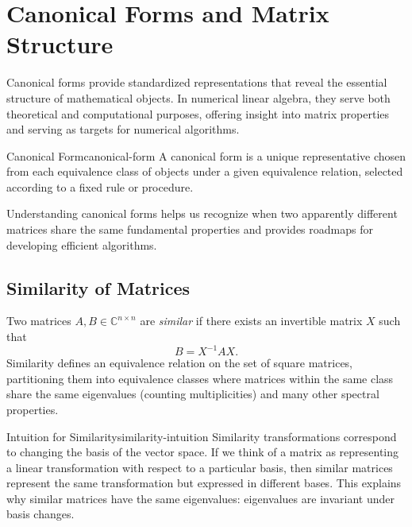 \documentclass[../../main.tex]{subfiles}
\begin{document}
\section{Canonical Forms and Matrix Structure}

Canonical forms provide standardized representations that reveal the essential structure of mathematical objects. In numerical linear algebra, they serve both theoretical and computational purposes, offering insight into matrix properties and serving as targets for numerical algorithms.

\begin{definition}{Canonical Form}{canonical-form}
    A canonical form is a unique representative chosen from each equivalence class of objects under a given equivalence relation, selected according to a fixed rule or procedure.
\end{definition}

Understanding canonical forms helps us recognize when two apparently different matrices share the same fundamental properties and provides roadmaps for developing efficient algorithms.

\subsection{Similarity of Matrices}

Two matrices $A, B \in \mathbb{C}^{n \times n}$ are \emph{similar} if there exists an invertible matrix $X$ such that
\[
    B = X^{-1} A X.
\]
Similarity defines an equivalence relation on the set of square matrices, partitioning them into equivalence classes where matrices within the same class share the same eigenvalues (counting multiplicities) and many other spectral properties.

\begin{remark}{Intuition for Similarity}{similarity-intuition}
    Similarity transformations correspond to changing the basis of the vector space. If we think of a matrix as representing a linear transformation with respect to a particular basis, then similar matrices represent the same transformation but expressed in different bases. This explains why similar matrices have the same eigenvalues: eigenvalues are invariant under basis changes.
\end{remark}
\end{document}

